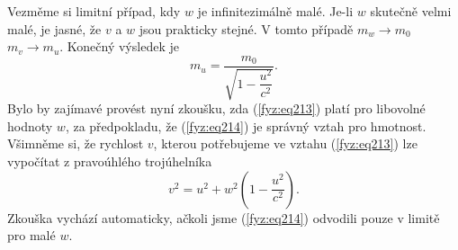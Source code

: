     Vezměme si limitní případ, kdy \(w\) je infinitezimálně malé. Je-li \(w\) skutečně velmi malé, 
    je jasné, že \(v\) a \(w\) jsou prakticky stejné. V tomto případě \(m_w \rightarrow m_0\)  
    \(m_v \rightarrow m_u\). Konečný výsledek je
    \begin{equation}\label{fyz:eq214}
      m_u = \frac{m_0}{\sqrt{1 - \dfrac{u^2}{c^2}}}.
    \end{equation}
    Bylo by zajímavé provést nyní zkoušku, zda (\ref{fyz:eq213}) platí pro libovolné hodnoty \(w\), 
    za předpokladu, že (\ref{fyz:eq214}) je správný vztah pro hmotnost. Všimněme si, že rychlost 
    \(v\), kterou potřebujeme ve vztahu (\ref{fyz:eq213}) lze vypočítat z pravoúhlého trojúhelníka
    \begin{equation}\label{fyz:eq215}
      v^2 = u^2 + w^2\left(1 - \dfrac{u^2}{c^2}\right).
    \end{equation}
    Zkouška vychází automaticky, ačkoli jsme (\ref{fyz:eq214}) odvodili pouze v limitě pro malé 
    \(w\).
    
